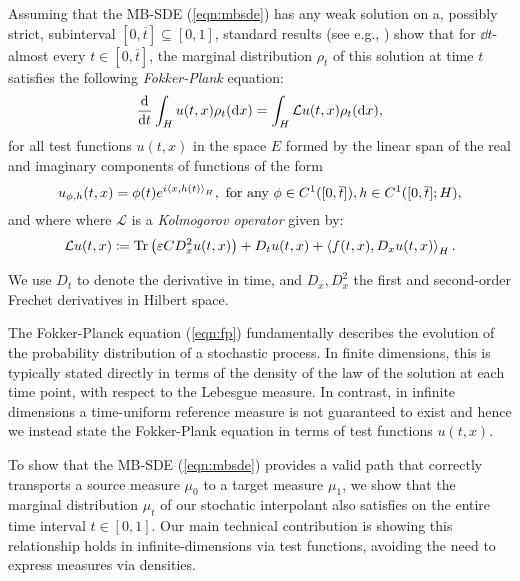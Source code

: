 Assuming that the MB-SDE (\ref{eqn:mbsde}) has any weak solution on a, possibly strict, subinterval \([0, \overline{t}] \subseteq [0, 1]\), standard results (see e.g., \citealp[][Chapter 14.2.2]{da2014stochastic}) show that for \(\dd{t}\)-almost every \(t \in [0, \overline{t}]\), the marginal distribution \(\rho_{t}\) of this solution at time \(t\) satisfies the following \textit{Fokker-Plank} equation:
\begin{equation}
  \dv{t} \int_{H} u(t, x) \rho_{t}(\dd{x}) = \int_{H} \mathcal{L} u(t, x) \rho_{t}(\dd{x}), \label{eqn:fp}
\end{equation}
for all test functions \(u(t, x)\) in the space \(E\) formed by the linear span of the real and imaginary components of functions of the form
\begin{equation}
  u_{\phi, h}(t, x) = \phi(t) e^{i \ev{x, h(t)}_{H}},  \text{ for any }\phi \in C^{1}([0, \overline{t}]), h \in C^{1}([0, \overline{t}]; H), \label{eqn:testfns}
\end{equation}
and where where \(\mathcal{L}\) is a \textit{Kolmogorov operator} given by:
\[
  \mathcal{L} u(t, x) \coloneqq  \operatorname{Tr}\qty(\varepsilon C D^{2}_{x} u(t, x)) + D_{t}u(t, x) + \ev{f(t, x), D_{x} u(t, x)}_{H}.
\]

We use \(D_{t}\) to denote the derivative in time, and \(D_{x}, D^{2}_{x}\) the first and second-order Frechet derivatives in Hilbert space. %

The Fokker-Planck equation (\ref{eqn:fp}) fundamentally describes the evolution of the probability distribution of a stochastic process. In finite dimensions, this is typically stated directly in terms of the density of the law of the solution at each time point, with respect to the Lebesgue measure. In contrast, in infinite dimensions a time-uniform reference measure is not guaranteed to exist and hence we instead state the Fokker-Plank equation in terms of test functions \(u(t, x)\).

To show that the MB-SDE (\ref{eqn:mbsde}) provides a valid path that correctly transports a source measure \(\mu_{0}\) to a target measure \(\mu_{1}\), we show that the marginal distribution \(\mu_{t}\) of our stochatic interpolant also satisfies  on the entire time interval \(t \in [0, 1]\). Our main technical contribution is showing this relationship holds in infinite-dimensions via test functions, avoiding the need to express measures via densities.


